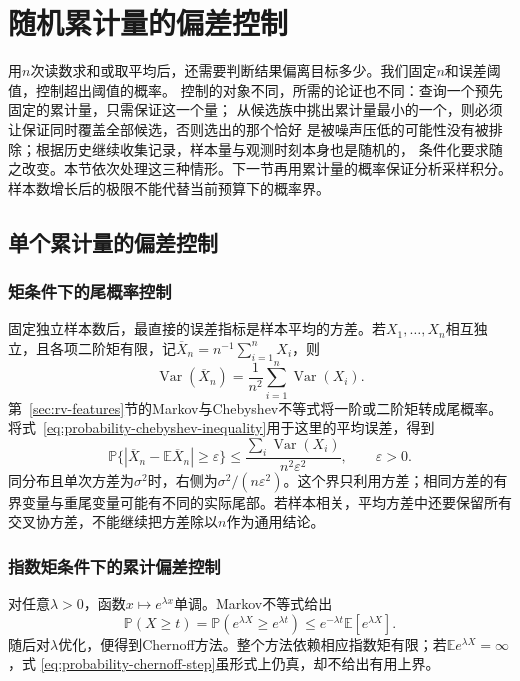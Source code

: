 \section{随机累计量的偏差控制}
\label{sec:probability-averages-errors}
\label{sec:rv-aggregation}
用\(n\)次读数求和或取平均后，还需要判断结果偏离目标多少。我们固定\(n\)和误差阈值，控制超出阈值的概率。
控制的对象不同，所需的论证也不同：查询一个预先固定的累计量，只需保证这一个量；
从候选族中挑出累计量最小的一个，则必须让保证同时覆盖全部候选，否则选出的那个恰好
是被噪声压低的可能性没有被排除；根据历史继续收集记录，样本量与观测时刻本身也是随机的，
条件化要求随之改变。本节依次处理这三种情形。下一节再用累计量的概率保证分析采样积分。
样本数增长后的极限不能代替当前预算下的概率界。

\subsection{单个累计量的偏差控制}
\label{sec:probability-basic-tail-bounds}
\label{sec:probability-concentration-inequalities}
\subsubsection{矩条件下的尾概率控制}
固定独立样本数后，最直接的误差指标是样本平均的方差。若\(X_1,\ldots,X_n\)相互独立，且各项二阶矩有限，记\(\overline X_n=n^{-1}\sum_{i=1}^nX_i\)，则
\[
 \operatorname{Var}(\overline X_n)
 =\frac1{n^2}\sum_{i=1}^n\operatorname{Var}(X_i).
\]
第~\ref{sec:rv-features}节的Markov与Chebyshev不等式将一阶或二阶矩转成尾概率。将式~\eqref{eq:probability-chebyshev-inequality}用于这里的平均误差，得到
\[
 \mathbb P\{|\overline X_n-\mathbb E\overline X_n|\geq\varepsilon\}
 \leq\frac{\sum_i\operatorname{Var}(X_i)}{n^2\varepsilon^2},
 \qquad\varepsilon>0.
\]
同分布且单次方差为\(\sigma^2\)时，右侧为\(\sigma^2/(n\varepsilon^2)\)。这个界只利用方差；相同方差的有界变量与重尾变量可能有不同的实际尾部。若样本相关，平均方差中还要保留所有交叉协方差，不能继续把方差除以\(n\)作为通用结论。

\subsubsection{指数矩条件下的累计偏差控制}
对任意\(\lambda>0\)，函数\(x\mapsto e^{\lambda x}\)单调。Markov不等式给出
\begin{equation}
  \mathbb{P}(X\geq t)
  =
  \mathbb{P}(e^{\lambda X}\geq e^{\lambda t})
  \leq
  e^{-\lambda t}\mathbb{E}[e^{\lambda X}].
  \label{eq:probability-chernoff-step}
\end{equation}
随后对\(\lambda\)优化，便得到Chernoff方法。整个方法依赖相应指数矩有限；若\(\mathbb{E}e^{\lambda X}=\infty\)，式
\eqref{eq:probability-chernoff-step}虽形式上仍真，却不给出有用上界。


